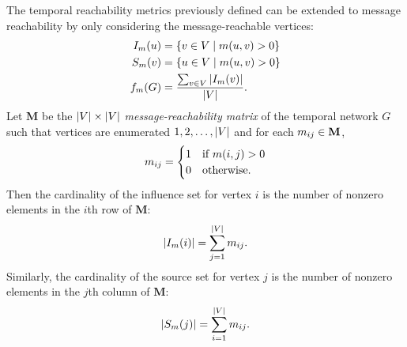 The temporal reachability metrics previously defined can be extended to message reachability by only considering the message-reachable vertices:
%
\begin{align*}
	I_m(u) &= \{v \in V \mid m(u, v) > 0\} \\
	S_m(v) &= \{u \in V \mid m(u, v) > 0\} \\
	f_m(G) &= \frac{\sum_{v \in V} \left\vert I_m(v) \right\vert}{\left\vert V \right\vert} .
\end{align*}
%
Let $\mathbf{M}$ be the $\left\vert V \right\vert \times \left\vert V \right\vert$ \emph{message-reachability matrix} of the temporal network $G$ such that vertices are enumerated $1, 2, \ldots, \left\vert V \right\vert$ and for each $m_{ij} \in \mathbf{M}$,
%
\begin{equation*}
	m_{ij} = 
	   \begin{cases}
        	1 & \text{if } m(i, j) > 0 \\
        	0 & \text{otherwise.}
	   \end{cases}
\end{equation*}
%
Then the cardinality of the influence set for vertex $i$ is the number of
nonzero elements in the $i$th row of $\mathbf{M}$:
%
\begin{equation}\label{eq:influence-size}
	\left\vert I_m(i) \right\vert = \sum_{j=1}^{\left\vert V \right\vert} m_{ij} .
\end{equation}
%
Similarly, the cardinality of the source set for vertex $j$ is the number of nonzero elements in the $j$th column of $\mathbf{M}$:
%
\begin{equation}\label{eq:source-size}
	\left\vert S_m(j) \right\vert = \sum_{i=1}^{\left\vert V \right\vert} m_{ij} .
\end{equation}

